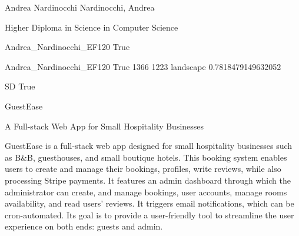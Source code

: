 \documentclass[twoside]{report}
\begin{document}
\begingroup{}\relax



\def\Key{Andrea_Nardinocchi_EF120}

{Andrea Nardinocchi}
{Nardinocchi, Andrea}

{Higher Diploma in Science in Computer Science}

{Andrea_Nardinocchi_EF120}
{True}

{Andrea_Nardinocchi_EF120}
{True}
{1366}
{1223}
{landscape}
{0.7818479149632052}

{SD}
{True}

{GuestEase}

{A Full-stack Web App for Small Hospitality Businesses}

{GuestEase is a full-stack web app designed for small hospitality businesses such as B\&B, guesthouses, and small boutique hotels. This booking system enables users to create and manage their bookings, profiles, write reviews, while also processing Stripe payments. It features an admin dashboard through which the administrator can create, and manage bookings, user accounts, manage rooms availability, and read users' reviews. It triggers email notifications, which can be cron-automated. Its goal is to provide a user-friendly tool to streamline the user experience on both ends: guests and admin.}
\end{document}
